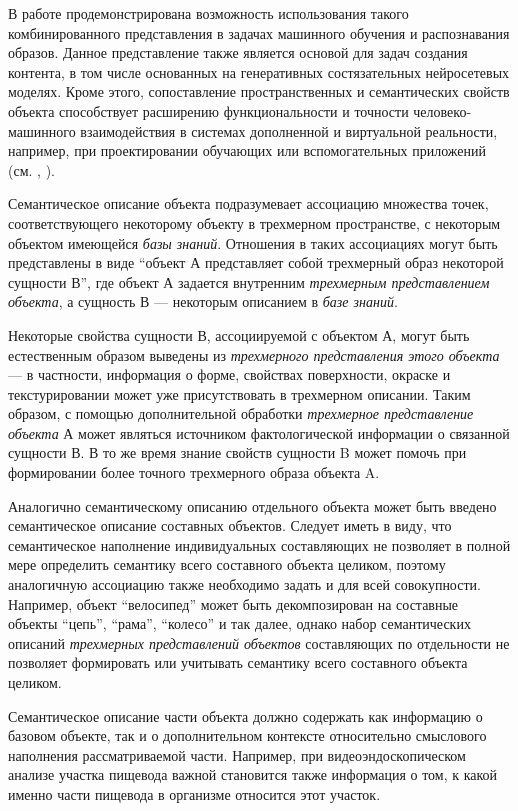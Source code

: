 В работе  продемонстрирована возможность использования такого комбинированного представления в задачах машинного обучения и распознавания образов. Данное представление также является основой для задач создания контента, в том числе основанных на генеративных состязательных нейросетевых моделях. Кроме этого, сопоставление пространственных и семантических свойств объекта способствует расширению функциональности и точности человеко-машинного взаимодействия в системах дополненной и виртуальной реальности, например, при проектировании обучающих или вспомогательных приложений (см. , ).

Семантическое описание объекта подразумевает ассоциацию множества точек, соответствующего некоторому объекту в трехмерном пространстве, с некоторым объектом имеющейся \textit{базы знаний}. Отношения в таких ассоциациях могут быть представлены в виде ``объект А представляет собой трехмерный образ некоторой сущности В'', где объект А задается внутренним \textit{трехмерным представлением объекта}, а сущность В --- некоторым описанием в \textit{базе знаний}.

Некоторые свойства сущности В, ассоциируемой с объектом А, могут быть естественным образом выведены из \textit{трехмерного представления этого объекта} --- в частности, информация о форме, свойствах поверхности, окраске и текстурировании может уже присутствовать в трехмерном описании. Таким образом, с помощью дополнительной обработки \textit{трехмерное представление объекта} А может являться источником фактологической информации о связанной сущности В. В то же время знание свойств сущности B может помочь при формировании более точного трехмерного образа объекта A. 

Аналогично семантическому описанию отдельного объекта может быть введено семантическое описание составных объектов. Следует иметь в виду, что семантическое наполнение индивидуальных составляющих не позволяет в полной мере определить семантику всего составного объекта целиком, поэтому аналогичную ассоциацию также необходимо задать и для всей совокупности. Например, объект ``велосипед'' может быть декомпозирован на составные объекты ``цепь'', ``рама'', ``колесо'' и так далее, однако набор семантических описаний \textit{трехмерных представлений объектов} составляющих по отдельности не позволяет формировать или учитывать семантику всего составного объекта целиком.

Семантическое описание части объекта должно содержать как информацию о базовом объекте, так и о дополнительном контексте относительно смыслового наполнения рассматриваемой части. Например, при видеоэндоскопическом анализе участка пищевода важной становится также информация о том, к какой именно части пищевода в организме относится этот участок.

